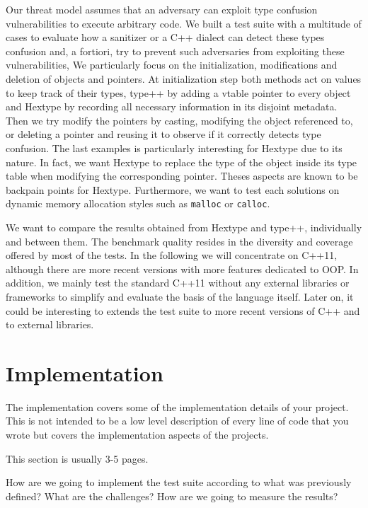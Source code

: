\documentclass[a4paper,11pt,oneside]{report}
\begin{document}
Our threat model assumes that an adversary can exploit type confusion vulnerabilities to execute arbitrary code. 
We built a test suite with a multitude of cases to evaluate how a sanitizer or a C++ dialect can detect these types confusion and, 
a fortiori, try to prevent such adversaries from exploiting these vulnerabilities,
We particularly focus on the initialization, modifications and deletion of objects and pointers. At initialization step 
both methods act on values to keep track of their types, type++ by adding a vtable pointer to every object and Hextype by recording all necessary 
information in its disjoint metadata. Then we try modify the pointers by casting, modifying the object referenced to, 
or deleting a pointer and reusing it to observe if it correctly detects type confusion. The last examples is particularly interesting
for Hextype due to its nature. In fact, we want Hextype to replace the type of the object inside its type table when modifying 
the corresponding pointer. Theses aspects are known to be backpain points for Hextype. Furthermore, we want to test each solutions
on dynamic memory allocation styles such as \texttt{malloc} or \texttt{calloc}. 

We want to compare the results obtained from Hextype and type++, individually and between them. The benchmark quality resides 
in the diversity and coverage offered by most of the tests. In the following we will concentrate on C++11,
although there are more recent versions with more features dedicated to OOP. In addition, we mainly test the standard
C++11 without any external libraries or frameworks to simplify and evaluate the basis of the language itself. Later on,
it could be interesting to extends the test suite to more recent versions of C++ and to external libraries. 

\chapter{Implementation}

The implementation covers some of the implementation details of your project.
This is not intended to be a low level description of every line of code that
you wrote but covers the implementation aspects of the projects.

This section is usually 3-5 pages.

How are we going to implement the test suite according to what was previously defined? What are the challenges? 
How are we going to measure the results?
\end{document}
